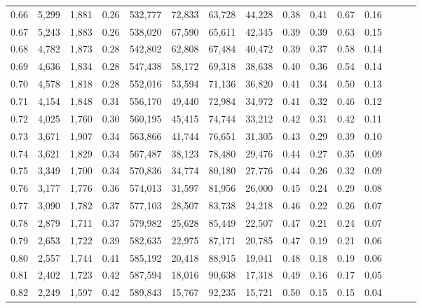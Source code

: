 \begin{tabular}{rrrrrrrrrrrrrrr}
0.66 &   5,299 &  1,881 &  0.26 &  532,777 &   72,833 &   63,728 &   44,228 &  0.38 &  0.41 &  0.67 &      0.16 \\
0.67 &   5,243 &  1,883 &  0.26 &  538,020 &   67,590 &   65,611 &   42,345 &  0.39 &  0.39 &  0.63 &      0.15 \\
0.68 &   4,782 &  1,873 &  0.28 &  542,802 &   62,808 &   67,484 &   40,472 &  0.39 &  0.37 &  0.58 &      0.14 \\
0.69 &   4,636 &  1,834 &  0.28 &  547,438 &   58,172 &   69,318 &   38,638 &  0.40 &  0.36 &  0.54 &      0.14 \\
0.70 &   4,578 &  1,818 &  0.28 &  552,016 &   53,594 &   71,136 &   36,820 &  0.41 &  0.34 &  0.50 &      0.13 \\
0.71 &   4,154 &  1,848 &  0.31 &  556,170 &   49,440 &   72,984 &   34,972 &  0.41 &  0.32 &  0.46 &      0.12 \\
0.72 &   4,025 &  1,760 &  0.30 &  560,195 &   45,415 &   74,744 &   33,212 &  0.42 &  0.31 &  0.42 &      0.11 \\
0.73 &   3,671 &  1,907 &  0.34 &  563,866 &   41,744 &   76,651 &   31,305 &  0.43 &  0.29 &  0.39 &      0.10 \\
0.74 &   3,621 &  1,829 &  0.34 &  567,487 &   38,123 &   78,480 &   29,476 &  0.44 &  0.27 &  0.35 &      0.09 \\
0.75 &   3,349 &  1,700 &  0.34 &  570,836 &   34,774 &   80,180 &   27,776 &  0.44 &  0.26 &  0.32 &      0.09 \\
0.76 &   3,177 &  1,776 &  0.36 &  574,013 &   31,597 &   81,956 &   26,000 &  0.45 &  0.24 &  0.29 &      0.08 \\
0.77 &   3,090 &  1,782 &  0.37 &  577,103 &   28,507 &   83,738 &   24,218 &  0.46 &  0.22 &  0.26 &      0.07 \\
0.78 &   2,879 &  1,711 &  0.37 &  579,982 &   25,628 &   85,449 &   22,507 &  0.47 &  0.21 &  0.24 &      0.07 \\
0.79 &   2,653 &  1,722 &  0.39 &  582,635 &   22,975 &   87,171 &   20,785 &  0.47 &  0.19 &  0.21 &      0.06 \\
0.80 &   2,557 &  1,744 &  0.41 &  585,192 &   20,418 &   88,915 &   19,041 &  0.48 &  0.18 &  0.19 &      0.06 \\
0.81 &   2,402 &  1,723 &  0.42 &  587,594 &   18,016 &   90,638 &   17,318 &  0.49 &  0.16 &  0.17 &      0.05 \\
0.82 &   2,249 &  1,597 &  0.42 &  589,843 &   15,767 &   92,235 &   15,721 &  0.50 &  0.15 &  0.15 &      0.04 \\

\end{tabular}
